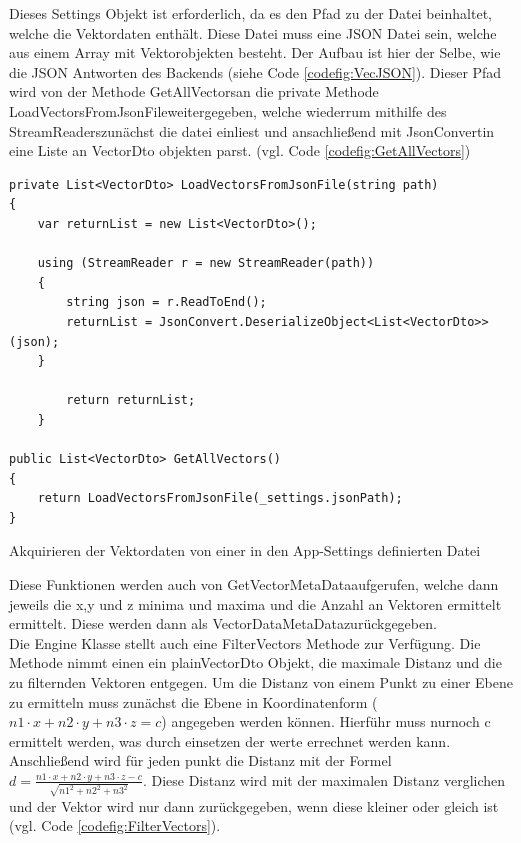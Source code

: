 Dieses Settings Objekt ist erforderlich, da es den Pfad zu der Datei beinhaltet, welche die Vektordaten enthält. Diese Datei muss eine JSON Datei sein, welche aus einem Array mit Vektorobjekten besteht. Der Aufbau ist hier der Selbe, wie die JSON Antworten des Backends (siehe Code \ref{codefig:VecJSON}). Dieser Pfad wird von der Methode \grqq GetAllVectors\grqq\space an die private Methode \grqq LoadVectorsFromJsonFile\grqq\space weitergegeben, welche wiederrum mithilfe des \grqq StreamReaders\grqq\space zunächst die datei einliest und ansachließend mit \grqq JsonConvert\grqq\space in eine Liste an VectorDto objekten parst. (vgl. Code \ref{codefig:GetAllVectors})
\begin{codefig}
	\centering
	\lstset{style=sharpc}
	\begin{lstlisting}
private List<VectorDto> LoadVectorsFromJsonFile(string path)
{
	var returnList = new List<VectorDto>();

	using (StreamReader r = new StreamReader(path))
	{
		string json = r.ReadToEnd();
		returnList = JsonConvert.DeserializeObject<List<VectorDto>>(json);
	}

		return returnList;
	}

public List<VectorDto> GetAllVectors()
{
	return LoadVectorsFromJsonFile(_settings.jsonPath);
}
	\end{lstlisting}
	\caption{Akquirieren der Vektordaten von einer in den App-Settings definierten Datei}
	\label{codefig:GetAllVectors}
\end{codefig}
Diese Funktionen werden auch von \grqq GetVectorMetaData\grqq\space aufgerufen, welche dann jeweils die x,y und z minima und maxima und die Anzahl an Vektoren ermittelt ermittelt. Diese werden dann als \grqq VectorDataMetaData\grqq\space zurückgegeben.\\
Die Engine Klasse stellt auch eine FilterVectors Methode zur Verfügung. Die Methode nimmt einen ein plainVectorDto Objekt, die maximale Distanz und die zu filternden Vektoren entgegen. Um die Distanz von einem Punkt zu einer Ebene zu ermitteln muss zunächst die Ebene in Koordinatenform ($n1 \cdot x + n2 \cdot y + n3 \cdot z = c$) angegeben werden können. Hierführ muss nurnoch c ermittelt werden, was durch einsetzen der werte errechnet werden kann. Anschließend wird für jeden punkt die Distanz mit der Formel $d = \frac{n1 \cdot x + n2 \cdot y + n3 \cdot z - c}{\sqrt{n1^2 + n2^2 + n3^2}}$. Diese Distanz wird mit der maximalen Distanz verglichen und der Vektor wird nur dann zurückgegeben, wenn diese kleiner oder gleich ist (vgl. Code \ref{codefig:FilterVectors}).
